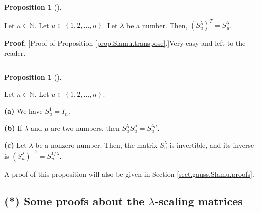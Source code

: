 \documentclass[numbers=enddot,12pt,final,onecolumn,notitlepage]{scrartcl}%
\theoremstyle{definition}
\newtheorem{prop}[theo]{Proposition}
\newenvironment{proposition}[1][]
{\begin{prop}[#1]\begin{leftbar}}
{\end{leftbar}\end{prop}}
\newenvironment{proof}[1][Proof]{\noindent\textbf{#1.} }{\ \rule{0.5em}{0.5em}}
\begin{document}
\begin{proposition}
\label{prop.Slamu.transpose}Let $n\in\mathbb{N}$. Let $u\in\left\{
1,2,\ldots,n\right\}  $. Let $\lambda$ be a number. Then, $\left(
S_{u}^{\lambda}\right)  ^{T}=S_{u}^{\lambda}$.
\end{proposition}

\begin{proof}
[Proof of Proposition \ref{prop.Slamu.transpose}.]Very easy and left to the reader.
\end{proof}

\begin{proposition}
\label{prop.Slamu.lambda+mu}Let $n\in\mathbb{N}$. Let $u\in\left\{
1,2,\ldots,n\right\}  $.

\textbf{(a)} We have $S_{u}^{1}=I_{n}$.

\textbf{(b)} If $\lambda$ and $\mu$ are two numbers, then $S_{u}^{\lambda
}S_{u}^{\mu}=S_{u}^{\lambda\mu}$.

\textbf{(c)} Let $\lambda$ be a nonzero number. Then, the matrix
$S_{u}^{\lambda}$ is invertible, and its inverse is $\left(  S_{u}^{\lambda
}\right)  ^{-1}=S_{u}^{1/\lambda}$.
\end{proposition}

A proof of this proposition will also be given in Section
\ref{sect.gauss.Slamu.proofs}.

\subsection{\label{sect.gauss.Slamu.proofs}(*) Some proofs about the $\lambda
$-scaling matrices}
\end{document}
